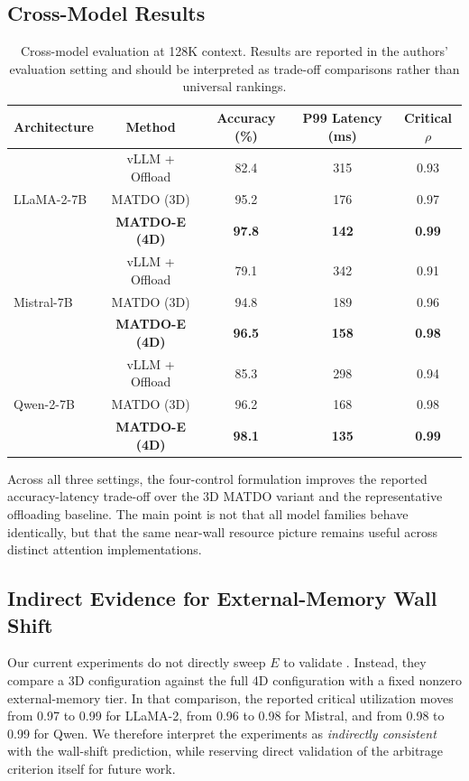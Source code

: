 \documentclass[11pt,a4paper]{article}
\theoremstyle{plain}
\theoremstyle{definition}
\begin{document}
\subsection{Cross-Model Results}
\begin{table}[h]
\centering
\caption{Cross-model evaluation at 128K context. Results are reported in the authors' evaluation setting and should be interpreted as trade-off comparisons rather than universal rankings.}
\label{tab:cross}
\begin{tabular}{@{}lcccc@{}}
\toprule
Architecture & Method & Accuracy (\%) & P99 Latency (ms) & Critical $\rho$ \\
\midrule
\multirow{3}{*}{LLaMA-2-7B}
& vLLM + Offload & 82.4 & 315 & 0.93 \\
& MATDO (3D) & 95.2 & 176 & 0.97 \\
& \textbf{MATDO-E (4D)} & \textbf{97.8} & \textbf{142} & \textbf{0.99} \\
\midrule
\multirow{3}{*}{Mistral-7B}
& vLLM + Offload & 79.1 & 342 & 0.91 \\
& MATDO (3D) & 94.8 & 189 & 0.96 \\
& \textbf{MATDO-E (4D)} & \textbf{96.5} & \textbf{158} & \textbf{0.98} \\
\midrule
\multirow{3}{*}{Qwen-2-7B}
& vLLM + Offload & 85.3 & 298 & 0.94 \\
& MATDO (3D) & 96.2 & 168 & 0.98 \\
& \textbf{MATDO-E (4D)} & \textbf{98.1} & \textbf{135} & \textbf{0.99} \\
\bottomrule
\end{tabular}
\end{table}

Across all three settings, the four-control formulation improves the reported accuracy-latency trade-off over the 3D MATDO variant and the representative offloading baseline. The main point is not that all model families behave identically, but that the same near-wall resource picture remains useful across distinct attention implementations.

\subsection{Indirect Evidence for External-Memory Wall Shift}
Our current experiments do not directly sweep $E$ to validate . Instead, they compare a 3D configuration against the full 4D configuration with a fixed nonzero external-memory tier. In that comparison, the reported critical utilization moves from 0.97 to 0.99 for LLaMA-2, from 0.96 to 0.98 for Mistral, and from 0.98 to 0.99 for Qwen. We therefore interpret the experiments as \emph{indirectly consistent} with the wall-shift prediction, while reserving direct validation of the arbitrage criterion itself for future work.
\end{document}
